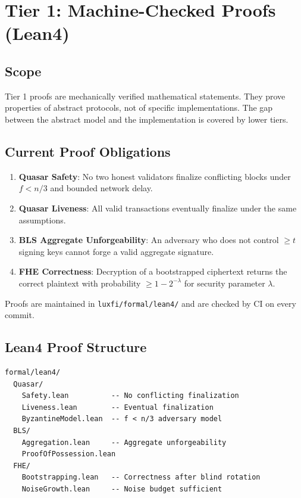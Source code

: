 \documentclass[11pt]{article}
\begin{document}
\section{Tier 1: Machine-Checked Proofs (Lean4)}

\subsection{Scope}

Tier 1 proofs are mechanically verified mathematical statements. They prove properties of abstract protocols, not of specific implementations. The gap between the abstract model and the implementation is covered by lower tiers.

\subsection{Current Proof Obligations}

\begin{enumerate}
\item \textbf{Quasar Safety}: No two honest validators finalize conflicting blocks under $f < n/3$ and bounded network delay.
\item \textbf{Quasar Liveness}: All valid transactions eventually finalize under the same assumptions.
\item \textbf{BLS Aggregate Unforgeability}: An adversary who does not control $\geq t$ signing keys cannot forge a valid aggregate signature.
\item \textbf{FHE Correctness}: Decryption of a bootstrapped ciphertext returns the correct plaintext with probability $\geq 1 - 2^{-\lambda}$ for security parameter $\lambda$.
\end{enumerate}

Proofs are maintained in \texttt{luxfi/formal/lean4/} and are checked by CI on every commit.

\subsection{Lean4 Proof Structure}

\begin{verbatim}
formal/lean4/
  Quasar/
    Safety.lean          -- No conflicting finalization
    Liveness.lean        -- Eventual finalization
    ByzantineModel.lean  -- f < n/3 adversary model
  BLS/
    Aggregation.lean     -- Aggregate unforgeability
    ProofOfPossession.lean
  FHE/
    Bootstrapping.lean   -- Correctness after blind rotation
    NoiseGrowth.lean     -- Noise budget sufficient
\end{verbatim}
\end{document}

